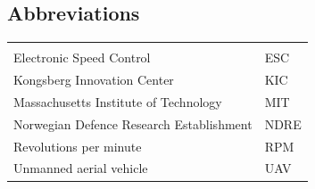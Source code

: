 \documentclass{article}
\begin{document}
\vspace*{2.0 cm}

\begin{center}
\section*{\textbf{Abbreviations}}
\begin{tabular}{ll}
\rowcolor{cadetgrey}
    &   \\
Electronic Speed Control      & ESC          \\\rowcolor{gainsboro}
Kongsberg Innovation Center & KIC \\
Massachusetts Institute of Technology       & MIT
\\\rowcolor{gainsboro}
Norwegian Defence Research Establishment   & NDRE \\
Revolutions per minute      & RPM         
\\\rowcolor{gainsboro}
Unmanned aerial vehicle     & UAV   \\
\end{tabular}                                                             
\end{center}
\newpage


%

\tableofcontents
\listoffigures
\newpage



\newpage


\newpage


\newpage


\newpage


%
\end{document}
